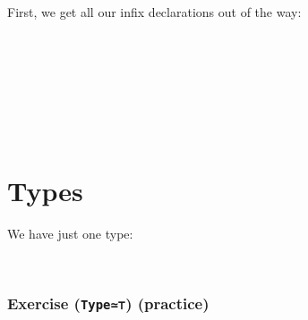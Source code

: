 First, we get all our infix declarations out of the way:

\begin{fence}
\begin{code}%
\>[0]%
\>[7]%
\>[10]\<%
\\
\>[0]%
\>[7]%
\>[10]\<%
\\
\>[0]\AgdaSpace{}%
%
\>[10]\AgdaOperator{\AgdaInductiveConstructor{\AgdaUnderscore{},\AgdaUnderscore{}}}\<%
\\
%
\\[\AgdaEmptyExtraSkip]%
\>[0]%
\>[7]%
\>[10]\<%
\\
\>[0]%
\>[7]%
\>[10]\<%
\\
\>[0]\AgdaSpace{}%
%
\>[10]\<%
\end{code}
\end{fence}

\hypertarget{types}{%
\section{Types}\label{types}}

We have just one type:

\begin{fence}
\begin{code}%
\>[0]\AgdaSpace{}%
\AgdaSpace{}%
\AgdaSymbol{:}\AgdaSpace{}%
\AgdaSpace{}%
\<%
\\
\>[0][@{}l@{\AgdaIndent{0}}]%
\>[2]\AgdaSpace{}%
\AgdaSymbol{:}\AgdaSpace{}%
\<%
\end{code}
\end{fence}

\hypertarget{exercise-type-practice}{%
\subsubsection{\texorpdfstring{Exercise (\texttt{Type≃⊤})
(practice)}{Exercise (Type≃⊤) (practice)}}\label{exercise-type-practice}}


